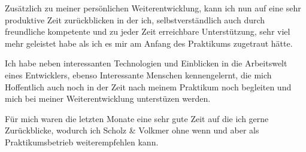 \documentclass[11pt]{article} %
\begin{document}
Zusätzlich zu meiner persönlichen Weiterentwicklung, kann ich nun auf eine sehr produktive Zeit zurückblicken in der ich, selbstverständlich auch durch freundliche kompetente und zu jeder Zeit erreichbare Unterstützung, sehr viel mehr geleistet habe als ich es mir am Anfang des Praktikums zugetraut hätte.

Ich habe neben interessanten Technologien und Einblicken in die Arbeitswelt eines Entwicklers, ebenso Interessante Menschen kennengelernt, die mich Hoffentlich auch noch in der Zeit nach meinem Praktikum noch begleiten und mich bei meiner Weiterentwicklung unterstüzen werden.

Für mich waren die letzten Monate eine sehr gute Zeit auf die ich gerne Zurückblicke, wodurch ich Scholz \& Volkmer ohne wenn und aber als Praktikumsbetrieb weiterempfehlen kann.



\newpage


\newpage

\end{document}

